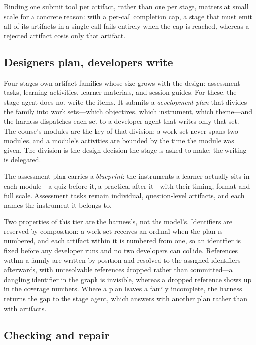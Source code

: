 Binding one submit tool per artifact, rather than one per stage, matters at small
scale for a concrete reason: with a per-call completion cap, a stage that must emit
all of its artifacts in a single call fails entirely when the cap is reached,
whereas a rejected artifact costs only that artifact.

\subsection{Designers plan, developers write}
\label{sec:fanout}

Four stages own artifact families whose size grows with the design: assessment
tasks, learning activities, learner materials, and session guides. For these, the
stage agent does not write the items. It submits a \emph{development plan} that
divides the family into work sets---which objectives, which instrument, which
theme---and the harness dispatches each set to a developer agent that writes only
that set. The course's modules are the key of that division: a work set never
spans two modules, and a module's activities are bounded by the time the module
was given. The division is the design decision the stage is asked to make; the
writing is delegated.

The assessment plan carries a \emph{blueprint}: the instruments a learner actually
sits in each module---a quiz before it, a practical after it---with their timing,
format and full scale. Assessment tasks remain individual, question-level
artifacts, and each names the instrument it belongs to.

Two properties of this tier are the harness's, not the model's. Identifiers are
reserved by composition: a work set receives an ordinal when the plan is numbered,
and each artifact within it is numbered from one, so an identifier is fixed before
any developer runs and no two developers can collide. References within a family
are written by position and resolved to the assigned identifiers afterwards, with
unresolvable references dropped rather than committed---a dangling identifier in
the graph is invisible, whereas a dropped reference shows up in the coverage
numbers. Where a plan leaves a family incomplete, the harness returns the gap to
the stage agent, which answers with another plan rather than with artifacts.

\subsection{Checking and repair}
\label{sec:qc}

